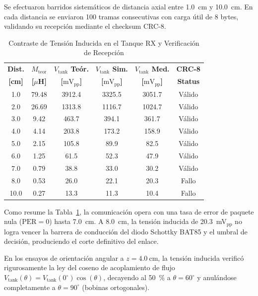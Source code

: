 Se efectuaron barridos sistemáticos de distancia axial entre \SI{1.0}{\centi\meter} y \SI{10.0}{\centi\meter}. En cada distancia se enviaron 100 tramas consecutivas con carga útil de 8 bytes, validando su recepción mediante el checksum CRC-8.

\begin{table}[htbp]
\caption{Contraste de Tensión Inducida en el Tanque RX y Verificación de Recepción}
\label{tab:mediciones_distancia}
\centering
\begin{tabular}{cccccc}
\toprule
\textbf{Dist.} & \textbf{$M_{\text{teor}}$} & \textbf{$V_{\text{tank}}$ Teór.} & \textbf{$V_{\text{tank}}$ Sim.} & \textbf{$V_{\text{tank}}$ Med.} & \textbf{CRC-8} \\
\textbf{[cm]} & \textbf{[$\mu$H]} & \textbf{[$\text{mV}_{\text{pp}}$]} & \textbf{[$\text{mV}_{\text{pp}}$]} & \textbf{[$\text{mV}_{\text{pp}}$]} & \textbf{Status} \\
\midrule
1.0 & 79.48 & 3912.4 & 3325.5 & 3051.7 & Válido \\
2.0 & 26.69 & 1313.8 & 1116.7 & 1024.7 & Válido \\
3.0 & 9.42  & 463.7  & 394.1  & 361.7  & Válido \\
4.0 & 4.14  & 203.8  & 173.2  & 158.9  & Válido \\
5.0 & 2.15  & 105.8  & 89.9   & 82.5   & Válido \\
6.0 & 1.25  & 61.5   & 52.3   & 47.9   & Válido \\
7.0 & 0.79  & 38.8   & 33.0   & 30.2   & Válido \\
8.0 & 0.53  & 26.0   & 22.1   & 20.3   & Fallo \\
10.0& 0.27  & 13.3   & 11.3   & 10.4   & Fallo \\
\bottomrule
\end{tabular}
\end{table}

Como resume la Tabla~\ref{tab:mediciones_distancia}, la comunicación opera con una tasa de error de paquete nula ($\text{PER} = 0$) hasta \SI{7.0}{\centi\meter}. A \SI{8.0}{\centi\meter}, la tensión inducida de \SI{20.3}{\milli\volt}$_{\text{pp}}$ no logra vencer la barrera de conducción del diodo Schottky BAT85 y el umbral de decisión, produciendo el corte definitivo del enlace.

En los ensayos de orientación angular a $z = \SI{4.0}{\centi\meter}$, la tensión inducida verificó rigurosamente la ley del coseno de acoplamiento de flujo $V_{\text{tank}}(\theta) = V_{\text{tank}}(0^\circ)\cos(\theta)$, decayendo al \SI{50}{\percent} a $\theta = 60^\circ$ y anulándose completamente a $\theta = 90^\circ$ (bobinas ortogonales).

